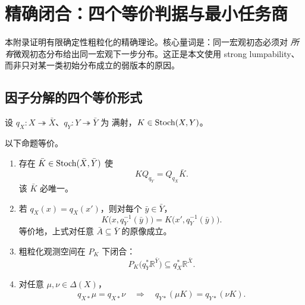 \section{精确闭合：四个等价判据与最小任务商}
\label{app:exact-theory}

本附录证明有限确定性粗粒化的精确理论。核心量词是：同一宏观初态必须对
\emph{所有}微观初态分布给出同一宏观下一步分布。这正是本文使用 strong
lumpability、而非只对某一类初始分布成立的弱版本的原因。

\subsection{因子分解的四个等价形式}

设 $q_X:X\twoheadrightarrow\bar X$、$q_Y:Y\twoheadrightarrow\bar Y$ 为
满射，$K\in\operatorname{Stoch}(X,Y)$。

\begin{theorem}[有限确定性粗粒化的四个等价判据]
\label{thm:app-four-equivalences}
以下命题等价。
\begin{enumerate}
  \item 存在 $\bar K\in\operatorname{Stoch}(\bar X,\bar Y)$ 使
  \begin{equation}
    KQ_{q_Y}=Q_{q_X}\bar K.
    \label{eq:app-exact-square}
  \end{equation}
  该 $\bar K$ 必唯一。
  \item 若 $q_X(x)=q_X(x')$，则对每个 $\bar y\in\bar Y$，
  \begin{equation}
    K\bigl(x,q_Y^{-1}(\bar y)\bigr)
    =K\bigl(x',q_Y^{-1}(\bar y)\bigr).
    \label{eq:app-block-probability}
  \end{equation}
  等价地，上式对任意 $\bar A\subseteq\bar Y$ 的原像成立。
  \item 粗粒化观测空间在 $P_K$ 下闭合：
  \begin{equation}
    P_K\bigl(q_Y^*\mathbb R^{\bar Y}\bigr)
    \subseteq q_X^*\mathbb R^{\bar X}.
    \label{eq:app-observable-invariance}
  \end{equation}
  \item 对任意 $\mu,\nu\in\Delta(X)$，
  \begin{equation}
   q_{X*}\mu=q_{X*}\nu
   \quad\Longrightarrow\quad
   q_{Y*}(\mu K)=q_{Y*}(\nu K).
   \label{eq:app-distribution-autonomy}
  \end{equation}
\end{enumerate}
\end{theorem}

